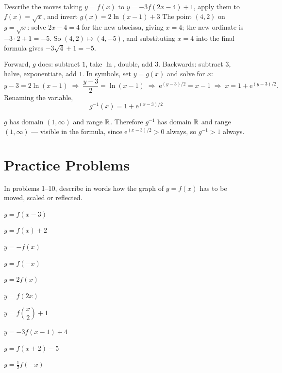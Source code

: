 \begin{worked}{Describe the moves taking $y=f(x)$ to $y=-3f(2x-4)+1$, apply them to $f(x)=\sqrt{x}$, and invert $g(x)=2\ln(x-1)+3$}
The point $(4,2)$ on $y=\sqrt{x}$: solve $2x-4=4$ for the new abscissa,
giving $x=4$; the new ordinate is $-3\cdot2+1=-5$. So $(4,2)\mapsto(4,-5)$,
and substituting $x=4$ into the final formula gives
$-3\sqrt{4}+1=-5$. \checkmark

Forward, $g$ does: subtract $1$, take $\ln$, double, add $3$. Backwards:
subtract $3$, halve, exponentiate, add $1$. In symbols, set $y=g(x)$ and
solve for $x$:
\[
  y-3=2\ln(x-1)
  \;\Longrightarrow\;
  \frac{y-3}{2}=\ln(x-1)
  \;\Longrightarrow\;
  \mathrm{e}^{(y-3)/2}=x-1
  \;\Longrightarrow\;
  x=1+\mathrm{e}^{(y-3)/2} .
\]
Renaming the variable,
\[
  \boxed{\;g^{-1}(x)=1+\mathrm{e}^{(x-3)/2}\;}
\]

$g$ has domain $(1,\infty)$ and range $\mathbb{R}$. Therefore $g^{-1}$ has domain
$\mathbb{R}$ and range $(1,\infty)$ --- visible in the formula, since
$\mathrm{e}^{(x-3)/2}>0$ always, so $g^{-1}>1$ always.
\end{worked}

\section{Practice Problems}

In problems 1--10, describe in words how the graph of $y=f(x)$ has to be
moved, scaled or reflected.

\begin{problems}
  \item $y=f(x-3)$
  \item $y=f(x)+2$
  \item $y=-f(x)$
  \item $y=f(-x)$
  \item $y=2f(x)$
  \item $y=f(2x)$
  \item $y=f\!\left(\dfrac{x}{2}\right)+1$
  \item $y=-3f(x-1)+4$
  \item $y=f(x+2)-5$
  \item $y=\tfrac12 f(-x)$
\end{problems}

